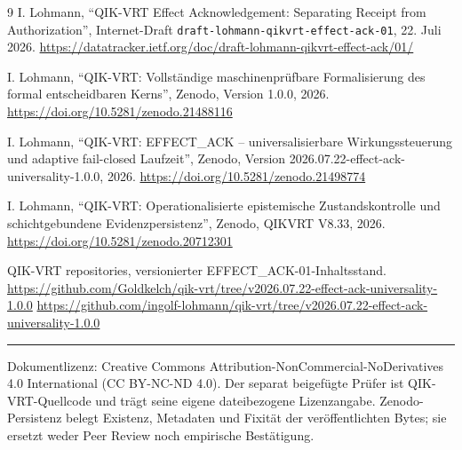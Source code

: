 \documentclass[11pt,a4paper]{article}
\begin{document}
\begin{thebibliography}{9}
I. Lohmann, ``QIK-VRT Effect Acknowledgement: Separating Receipt from
Authorization'', Internet-Draft \texttt{draft-lohmann-qikvrt-effect-ack-01},
22. Juli 2026.\newline
\url{https://datatracker.ietf.org/doc/draft-lohmann-qikvrt-effect-ack/01/}

I. Lohmann, ``QIK-VRT: Vollständige maschinenprüfbare Formalisierung des
formal entscheidbaren Kerns'', Zenodo, Version 1.0.0, 2026.\newline
\url{https://doi.org/10.5281/zenodo.21488116}

I. Lohmann, ``QIK-VRT: EFFECT\_ACK -- universalisierbare Wirkungssteuerung
und adaptive fail-closed Laufzeit'', Zenodo,
Version 2026.07.22-effect-ack-universality-1.0.0, 2026.\newline
\url{https://doi.org/10.5281/zenodo.21498774}

I. Lohmann, ``QIK-VRT: Operationalisierte epistemische Zustandskontrolle und
schichtgebundene Evidenzpersistenz'', Zenodo, QIKVRT V8.33, 2026.\newline
\url{https://doi.org/10.5281/zenodo.20712301}

QIK-VRT repositories, versionierter EFFECT\_ACK-01-Inhaltsstand.\newline
\url{https://github.com/Goldkelch/qik-vrt/tree/v2026.07.22-effect-ack-universality-1.0.0}\newline
\url{https://github.com/ingolf-lohmann/qik-vrt/tree/v2026.07.22-effect-ack-universality-1.0.0}
\end{thebibliography}

\vfill
\hrule
\vspace{1mm}
{\footnotesize
Dokumentlizenz: Creative Commons Attribution-NonCommercial-NoDerivatives
4.0 International (CC BY-NC-ND 4.0). Der separat beigefügte Prüfer ist
QIK-VRT-Quellcode und trägt seine eigene dateibezogene Lizenzangabe.
Zenodo-Persistenz belegt Existenz, Metadaten und Fixität der veröffentlichten
Bytes; sie ersetzt weder Peer Review noch empirische Bestätigung.
}
\end{document}

